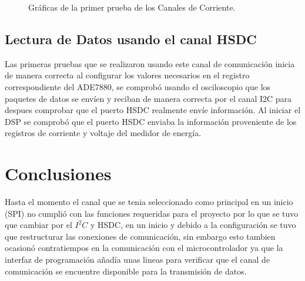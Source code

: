 \documentclass[letterpaper,12pt,oneside]{book}
\begin{document}
\begin{figure}[!htbp]
{			}
			\caption[Gráficas de la primer prueba de los Canales de Corriente]{Gráficas de la primer prueba de los Canales de Corriente.}
			\label{CanalCorriente}
		\end{figure}

		\section{Lectura de Datos usando el canal HSDC}
		Las primeras pruebas que se realizaron usando este canal de comunicación inicia de manera correcta al configurar los valores necesarios en el registro correspondiente del ADE7880, se comprobó usando el osciloscopio que los paquetes de datos se envíen y reciban de manera correcta por el canal I2C para despues comprobar que el puerto HSDC realmente envíe información.
		Al iniciar el DSP se comprobó que el puerto HSDC enviaba la información proveniente de los registros de corriente y voltaje del medidor de energía.
	\chapter{Conclusiones}
	Hasta el momento el canal que se tenia seleccionado como principal en un inicio (SPI) no cumplió con las funciones requeridas para el proyecto por lo que se tuvo que cambiar por el $I^2C$ y HSDC, en un inicio y debido a la configuración se tuvo que restructurar las conexiones de comunicación, sin embargo esto tambien ocasionó contratiempos en la comunicación con el microcontrolador ya que la interfaz de programación añadía unas lineas para verificar que el canal de comunicación se encuentre disponible para la transmisión de datos.
\end{document}
